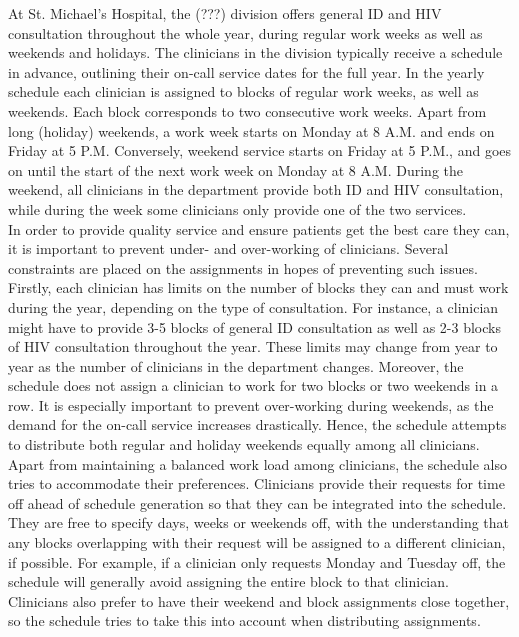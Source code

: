 At St. Michael's Hospital, the (???) division offers general ID and HIV consultation throughout the whole year, during regular work weeks as well as weekends and holidays. The clinicians in the division typically receive a schedule in advance, outlining their on-call service dates for the full year. In the yearly schedule each clinician is assigned to blocks of regular work weeks, as well as weekends. Each block corresponds to two consecutive work weeks. Apart from long (holiday) weekends, a work week starts on Monday at 8 A.M. and ends on Friday at 5 P.M. Conversely, weekend service starts on Friday at 5 P.M., and goes on until the start of the next work week on Monday at 8 A.M. During the weekend, all clinicians in the department provide both ID and HIV consultation, while during the week some clinicians only provide one of the two services. \\

In order to provide quality service and ensure patients get the best care they can, it is important to prevent under- and over-working of clinicians. Several constraints are placed on the assignments in hopes of preventing such issues. Firstly, each clinician has limits on the number of blocks they can and must work during the year, depending on the type of consultation. For instance, a clinician might have to provide 3-5 blocks of general ID consultation as well as 2-3 blocks of HIV consultation throughout the year. These limits may change from year to year as the number of clinicians in the department changes. Moreover, the schedule does not assign a clinician to work for two blocks or two weekends in a row. It is especially important to prevent over-working during weekends, as the demand for the on-call service increases drastically. Hence, the schedule attempts to distribute both regular and holiday weekends equally among all clinicians. \\

Apart from maintaining a balanced work load among clinicians, the schedule also tries to accommodate their preferences. Clinicians provide their requests for time off ahead of schedule generation so that they can be integrated into the schedule. They are free to specify days, weeks or weekends off, with the understanding that any blocks overlapping with their request will be assigned to a different clinician, if possible. For example, if a clinician only requests Monday and Tuesday off, the schedule will generally avoid assigning the entire block to that clinician. Clinicians also prefer to have their weekend and block assignments close together, so the schedule tries to take this into account when distributing assignments.

